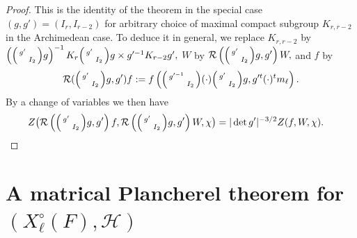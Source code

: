 \documentclass[12pt]{amsart}
\theoremstyle{remark}
\numberwithin{equation}{section}
\theoremstyle{definition}
\newenvironment{psmatrix}
  {\left(\begin{smallmatrix}}
  {\end{smallmatrix}\right)}
\numberwithin{equation}{subsection}
\begin{document}
\begin{proof}
This is the identity of the theorem in the special case $(g,g')=(I_r,I_{r-2})$ for arbitrary  choice of maximal compact subgroup $K_{r,r-2}$ in the Archimedean case.  To deduce it in general, we replace $K_{r,r-2}$ by $\left(\begin{psmatrix}
        g' & \\
          & I_2
    \end{psmatrix}g\right)^{-1}K_r\begin{psmatrix}
        g' & \\
          & I_2
    \end{psmatrix}g \times g'^{-1}K_{r-2}g',$ 
   $W$ by $\mathcal{R}\left(\begin{psmatrix}
        g' & \\
          & I_2
    \end{psmatrix}g,g'\right)W,$ and $f$ by 
\begin{align*}
   \mathcal{R}(\begin{psmatrix}
        g' & \\
          & I_2
    \end{psmatrix}g,g')f:=f\left(\begin{psmatrix}
        g'^{-1} & \\
         & I_2
    \end{psmatrix}(\cdot )\begin{psmatrix}
        g' & \\
          & I_2
    \end{psmatrix}g,g'^t(\cdot)^t m_{\ell}\right).
\end{align*}  By a change of variables we then have
\begin{align*}
    Z\big(\mathcal{R}\left(\begin{psmatrix}
        g' & \\
          & I_2
    \end{psmatrix}g,g' \right)f,\mathcal{R}\left(\begin{psmatrix}
        g' & \\
          & I_2
    \end{psmatrix}g,g'\right)W,\chi\big)&=|\det g'|^{-3/2}Z(f,W,\chi).
\end{align*}
\end{proof}



\section{A matrical Plancherel theorem for $(X^\circ_{\ell}(F),\mathcal{H})$}
\label{sec:Matric}
\end{document}

